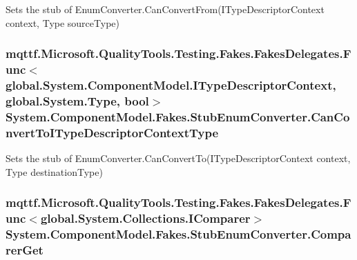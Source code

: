 Sets the stub of Enum\-Converter.\-Can\-Convert\-From(\-I\-Type\-Descriptor\-Context context, Type source\-Type)

\hypertarget{class_system_1_1_component_model_1_1_fakes_1_1_stub_enum_converter_a64fb4f816848042fcd8abc2008a95a06}{
\subsubsection[{Can\-Convert\-To\-I\-Type\-Descriptor\-Context\-Type}]{\setlength{\rightskip}{0pt plus 5cm}mqttf.\-Microsoft.\-Quality\-Tools.\-Testing.\-Fakes.\-Fakes\-Delegates.\-Func$<$global.\-System.\-Component\-Model.\-I\-Type\-Descriptor\-Context, global.\-System.\-Type, bool$>$ System.\-Component\-Model.\-Fakes.\-Stub\-Enum\-Converter.\-Can\-Convert\-To\-I\-Type\-Descriptor\-Context\-Type}}\label{class_system_1_1_component_model_1_1_fakes_1_1_stub_enum_converter_a64fb4f816848042fcd8abc2008a95a06}


Sets the stub of Enum\-Converter.\-Can\-Convert\-To(\-I\-Type\-Descriptor\-Context context, Type destination\-Type)

\hypertarget{class_system_1_1_component_model_1_1_fakes_1_1_stub_enum_converter_a08af69d9d097edbd7187c60e8e35e032}{
\subsubsection[{Comparer\-Get}]{\setlength{\rightskip}{0pt plus 5cm}mqttf.\-Microsoft.\-Quality\-Tools.\-Testing.\-Fakes.\-Fakes\-Delegates.\-Func$<$global.\-System.\-Collections.\-I\-Comparer$>$ System.\-Component\-Model.\-Fakes.\-Stub\-Enum\-Converter.\-Comparer\-Get}}\label{class_system_1_1_component_model_1_1_fakes_1_1_stub_enum_converter_a08af69d9d097edbd7187c60e8e35e032}


